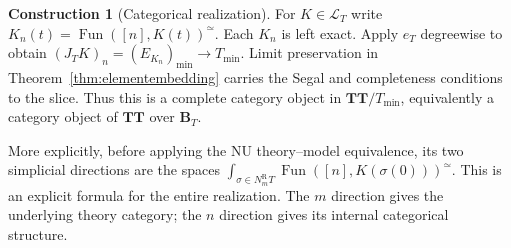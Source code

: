 \documentclass[oneside]{article}
\theoremstyle{plain}
\theoremstyle{definition}
\newtheorem{construction}[theorem]{Construction}
\theoremstyle{remark}
\newcommand{\B}{\mathbf B}
\newcommand{\Fun}{\operatorname{Fun}}
\newcommand{\J}{J}
\newcommand{\LT}{\mathcal L_T}
\newcommand{\Nn}[1]{N^{\mathrm R}_{#1}}
\newcommand{\TT}{\mathbf{TT}}
\newcommand{\core}{\simeq}
\newcommand{\eT}{e_T}
\newcommand{\minrep}{\mathrm{min}}
\begin{document}
\begin{construction}[Categorical realization]\label{con:J}
For $K\in\LT$ write $K_n(t)=\Fun([n],K(t))^{\core}.$ Each $K_n$ is left exact. Apply $\eT$ degreewise to obtain $(\J_TK)_n=(E_{K_n})_{\minrep}\longrightarrow T_{\minrep}.$ Limit preservation in Theorem~\ref{thm:elementembedding} carries the Segal and completeness conditions to the slice. Thus this is a complete category object in $\TT/T_{\minrep}$, equivalently a category object of $\TT$ over $\B_T$.

More explicitly, before applying the NU theory--model equivalence, its two simplicial directions are the spaces $\int_{\sigma\in\Nn m T}\Fun([n],K(\sigma(0)))^{\core}.$ This is an explicit formula for the entire realization. The $m$ direction gives the underlying theory category; the $n$ direction gives its internal categorical structure.
\end{construction}
\end{document}
